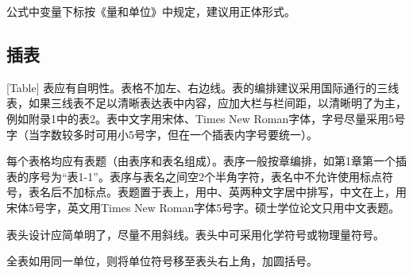 公式中变量下标按《量和单位》中规定，建议用正体形式。

\subsection{插表}[Table]
表应有自明性。表格不加左、右边线。表的编排建议采用国际通行的三线表，如果三线表不足以清晰表达表中内容，应加大栏与栏间距，以清晰明了为主，例如附录1中的表2。表中文字用宋体、Times New Roman字体，字号尽量采用5号字（当字数较多时可用小5号字，但在一个插表内字号要统一）。

每个表格均应有表题（由表序和表名组成）。表序一般按章编排，如第1章第一个插表的序号为“表1-1”。表序与表名之间空2个半角字符，表名中不允许使用标点符号，表名后不加标点。表题置于表上，用中、英两种文字居中排写，中文在上，用宋体5号字，英文用Times New Roman字体5号字。硕士学位论文只用中文表题。

表头设计应简单明了，尽量不用斜线。表头中可采用化学符号或物理量符号。

 全表如用同一单位，则将单位符号移至表头右上角，加圆括号。








